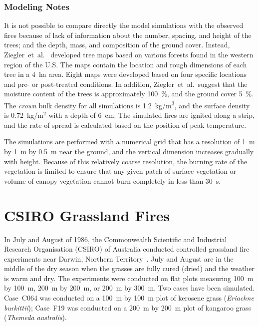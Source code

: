 \subsubsection{Modeling Notes}

It is not possible to compare directly the model simulations with the observed fires because of lack of information about the number, spacing, and height of the trees; and the depth, mass, and composition of the ground cover. Instead, Ziegler~et~al.~\cite{Ziegler:thesis,Ziegler:FEM2017,Ziegler:Data2019,Hoffman:FT2016} developed tree maps based on various forests found in the western region of the U.S. The maps contain the location and rough dimensions of each tree in a 4~ha area. Eight maps were developed based on four specific locations and pre- or post-treated conditions. In addition, Ziegler~et~al.~suggest that the moisture content of the trees is approximately 100~\%, and the ground cover 5~\%. The {\em crown} bulk density for all simulations is 1.2~\unit{kg/m^3}, and the surface density is 0.72~kg/m$^2$ with a depth of 6~cm. The simulated fires are ignited along a strip, and the rate of spread is calculated based on the position of peak temperature.

The simulations are performed with a numerical grid that has a resolution of 1~m by 1~m by 0.5~m near the ground, and the vertical dimension increases gradually with height. Because of this relatively coarse resolution, the burning rate of the vegetation is limited to ensure that any given patch of surface vegetation or volume of canopy vegetation cannot burn completely in less than 30~s.





\section{CSIRO Grassland Fires}
\label{CSIRO_Grassland_Fires_Description}

In July and August of 1986, the Commonwealth Scientific and Industrial Research Organisation (CSIRO) of Australia conducted controlled grassland fire experiments near Darwin, Northern Territory~\cite{Cheney:IJWF1993}. July and August are in the middle of the dry season when the grasses are fully cured (dried) and the weather is warm and dry. The experiments were conducted on flat plots measuring 100~m by 100~m, 200~m by 200~m, or 200~m by 300~m. Two cases have been simulated. Case~C064 was conducted on a 100~m by 100~m plot of kerosene grass ({\it Eriachne burkittii}); Case~F19 was conducted on a 200~m by 200~m plot of kangaroo grass ({\it Themeda australis}).

